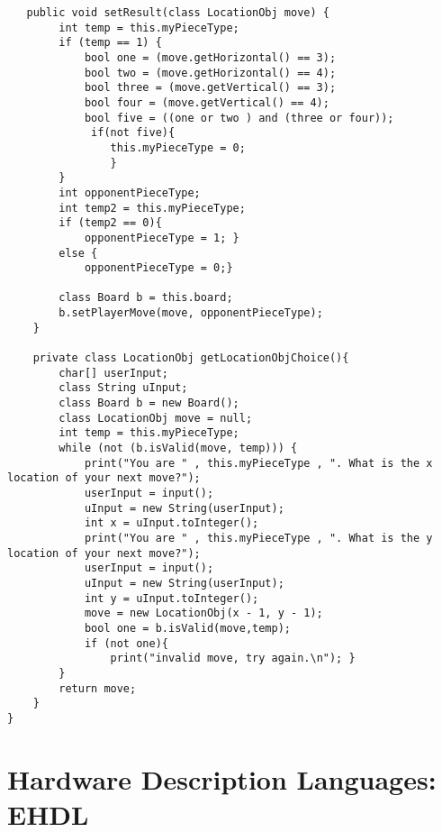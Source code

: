 \documentclass{plt}
\begin{document}
\begin{frame}[fragile]
\fontsize{4.8pt}{4.8pt}\selectfont
\begin{verbatim}
   public void setResult(class LocationObj move) {
        int temp = this.myPieceType;
        if (temp == 1) {
            bool one = (move.getHorizontal() == 3);
            bool two = (move.getHorizontal() == 4);
            bool three = (move.getVertical() == 3);
            bool four = (move.getVertical() == 4);
            bool five = ((one or two ) and (three or four)); 
             if(not five){
                this.myPieceType = 0;
                }
        }
        int opponentPieceType;
        int temp2 = this.myPieceType;
        if (temp2 == 0){
            opponentPieceType = 1; }
        else {
            opponentPieceType = 0;}

        class Board b = this.board;
        b.setPlayerMove(move, opponentPieceType);
    }

    private class LocationObj getLocationObjChoice(){ 
        char[] userInput;
        class String uInput;
        class Board b = new Board();
        class LocationObj move = null;
        int temp = this.myPieceType;    
        while (not (b.isValid(move, temp))) { 
            print("You are " , this.myPieceType , ". What is the x location of your next move?");
            userInput = input();
            uInput = new String(userInput);
            int x = uInput.toInteger();
            print("You are " , this.myPieceType , ". What is the y location of your next move?");
            userInput = input();
            uInput = new String(userInput);
            int y = uInput.toInteger();
            move = new LocationObj(x - 1, y - 1);
            bool one = b.isValid(move,temp);
            if (not one){
                print("invalid move, try again.\n"); }
        } 
        return move;
    }
}
\end{verbatim}
\end{frame}

\section{Hardware Description Languages: EHDL}
\end{document}
